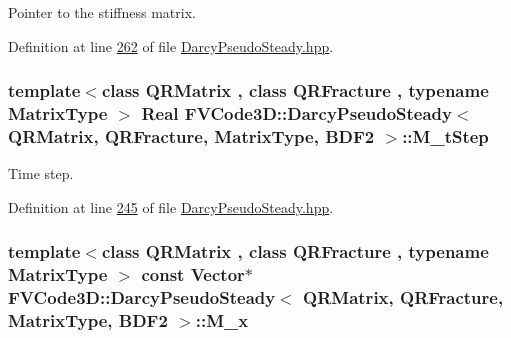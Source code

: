 Pointer to the stiffness matrix. 



Definition at line \hyperlink{DarcyPseudoSteady_8hpp_source_l00262}{262} of file \hyperlink{DarcyPseudoSteady_8hpp_source}{Darcy\+Pseudo\+Steady.\+hpp}.

\subsubsection[{\texorpdfstring{M\+\_\+t\+Step}{M_tStep}}]{\setlength{\rightskip}{0pt plus 5cm}template$<$class Q\+R\+Matrix , class Q\+R\+Fracture , typename Matrix\+Type $>$ {\bf Real} {\bf F\+V\+Code3\+D\+::\+Darcy\+Pseudo\+Steady}$<$ Q\+R\+Matrix, Q\+R\+Fracture, Matrix\+Type, {\bf B\+D\+F2} $>$\+::M\+\_\+t\+Step\hspace{0.3cm}{\ttfamily [protected]}}\hypertarget{classFVCode3D_1_1DarcyPseudoSteady_3_01QRMatrix_00_01QRFracture_00_01MatrixType_00_01BDF2_01_4_add13be3dd742cf61cb539b3503dbd536}{}\label{classFVCode3D_1_1DarcyPseudoSteady_3_01QRMatrix_00_01QRFracture_00_01MatrixType_00_01BDF2_01_4_add13be3dd742cf61cb539b3503dbd536}


Time step. 



Definition at line \hyperlink{DarcyPseudoSteady_8hpp_source_l00245}{245} of file \hyperlink{DarcyPseudoSteady_8hpp_source}{Darcy\+Pseudo\+Steady.\+hpp}.

\subsubsection[{\texorpdfstring{M\+\_\+x}{M_x}}]{\setlength{\rightskip}{0pt plus 5cm}template$<$class Q\+R\+Matrix , class Q\+R\+Fracture , typename Matrix\+Type $>$ const {\bf Vector}$\ast$ {\bf F\+V\+Code3\+D\+::\+Darcy\+Pseudo\+Steady}$<$ Q\+R\+Matrix, Q\+R\+Fracture, Matrix\+Type, {\bf B\+D\+F2} $>$\+::M\+\_\+x\hspace{0.3cm}{\ttfamily [protected]}}\hypertarget{classFVCode3D_1_1DarcyPseudoSteady_3_01QRMatrix_00_01QRFracture_00_01MatrixType_00_01BDF2_01_4_a62b0ac4a6c48a2000d38747a68293331}{}\label{classFVCode3D_1_1DarcyPseudoSteady_3_01QRMatrix_00_01QRFracture_00_01MatrixType_00_01BDF2_01_4_a62b0ac4a6c48a2000d38747a68293331}


